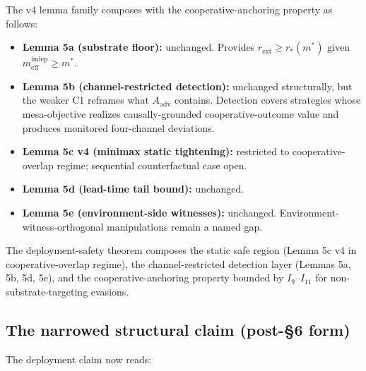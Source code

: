 \documentclass{article}
\newcommand{\rext}{r_{\mathrm{ext}}}
\newcommand{\meff}{m_{\mathrm{eff}}}
\begin{document}
The v4 lemma family composes with the cooperative-anchoring
property as follows:

\begin{itemize}
\item \textbf{Lemma 5a (substrate floor):} unchanged.  Provides
  $\rext \geq r_*(m^*)$ given $\meff^{\mathrm{indep}} \geq m^*$.
\item \textbf{Lemma 5b (channel-restricted detection):}
  unchanged structurally, but the weaker C1 reframes what
  $A_{\mathrm{adv}}$ contains.  Detection covers strategies whose
  mesa-objective realizes causally-grounded cooperative-outcome
  value and produces monitored four-channel deviations.
\item \textbf{Lemma 5c v4 (minimax static tightening):} restricted
  to cooperative-overlap regime; sequential counterfactual case
  open.
\item \textbf{Lemma 5d (lead-time tail bound):} unchanged.
\item \textbf{Lemma 5e (environment-side witnesses):} unchanged.
  Environment-witness-orthogonal manipulations remain a named gap.
\end{itemize}

The deployment-safety theorem composes the static safe region
(Lemma 5c v4 in cooperative-overlap regime), the channel-restricted
detection layer (Lemmas 5a, 5b, 5d, 5e), and the
cooperative-anchoring property bounded by $I_9$--$I_{11}$ for
non-substrate-targeting evasions.

\subsection{The narrowed structural claim (post-\S6 form)}

The deployment claim now reads:
\end{document}
